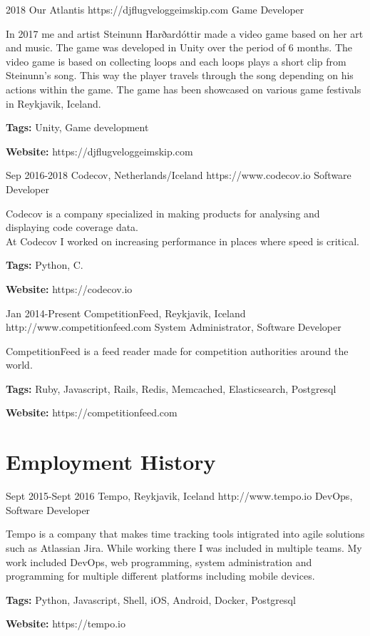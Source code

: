 \documentclass[10pt]{article} %
\begin{document}
\newpage
\job
{2018}{}
{Our Atlantis}
{https://djflugveloggeimskip.com}
{Game Developer}
{In 2017 me and artist Steinunn Harðardóttir made a video game based on her art and music. The game was developed in Unity over the period of 6 months. The video game is based on collecting loops and each loops plays a short clip from Steinunn's song. This way the player travels through the song depending on his actions within the game. The game has been showcased on various game festivals in Reykjavik, Iceland.\\
\rule{0mm}{5mm}\textbf{Tags:} Unity, Game development\\
\rule{0mm}{5mm}\textbf{Website:} https://djflugveloggeimskip.com
}

\job
{Sep 2016-}{2018}
{Codecov, Netherlands/Iceland}
{https://www.codecov.io}
{Software Developer}
{Codecov is a company specialized in making products for analysing and displaying code coverage data.\\
At Codecov I worked on increasing performance in places where speed is critical.\\
\rule{0mm}{5mm}\textbf{Tags:} Python, C.\\
\rule{0mm}{5mm}\textbf{Website:} https://codecov.io 
}

\job
{Jan 2014-}{Present}
{CompetitionFeed, Reykjavik, Iceland}
{http://www.competitionfeed.com}
{System Administrator, Software Developer}
{CompetitionFeed is a feed reader made for competition authorities around the world. \\
\rule{0mm}{5mm}\textbf{Tags:} Ruby, Javascript, Rails, Redis, Memcached, Elasticsearch, Postgresql\\
\rule{0mm}{5mm}\textbf{Website:} https://competitionfeed.com
}


\newpage

\section{Employment History}

\job
{Sept 2015-}{Sept 2016}
{Tempo, Reykjavik, Iceland}
{http://www.tempo.io}
{DevOps, Software Developer}
{Tempo is a company that makes time tracking tools intigrated into agile solutions such as Atlassian Jira.
While working there I was included in multiple teams. My work included DevOps, web programming, system administration and programming for multiple different platforms including mobile devices.\\
\rule{0mm}{5mm}\textbf{Tags:} Python, Javascript, Shell, iOS, Android, Docker, Postgresql\\
\rule{0mm}{5mm}\textbf{Website:} https://tempo.io
}
\end{document}
